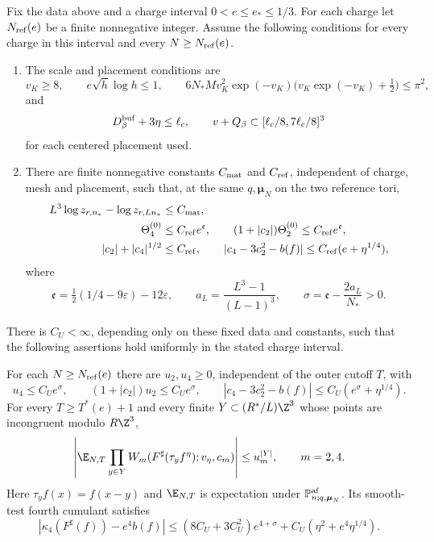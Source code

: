 \begin{theorem}\label{thm:vtm-main}
Fix the data above and a charge interval $0<e\le e_*\le1/3$.
For each charge let $N_{\rm ref}(e)$ be a finite nonnegative integer.
Assume the following conditions for every charge in this interval
and every $N\ge N_{\rm ref}(e)$.
\begin{enumerate}[label=\textup{(\roman*)}]
\item The scale and placement conditions are
\[
 v_K\ge8,\qquad e\sqrt h\log h\le1,\qquad
 6N_*Mv_K^2\exp(-v_K)
          \bigl(v_K\exp(-v_K)+\tfrac12\bigr)\le\pi^2,
\]
and
\begin{equation}\label{eq:cells-fit}
 D_\beta^{\rm buf}+3\eta\le\ell_c,\qquad
 v+Q_\beta\subset[\ell_c/8,7\ell_c/8]^3
\end{equation}
for each centered placement used.
\item There are finite nonnegative constants $C_{\rm mat}$ and
$C_{\rm ref}$, independent of charge, mesh and placement, such that,
at the same $q,\boldsymbol\mu_N$ on the two reference tori,
\begin{align}
 L^3\log z_{r,n_*}-\log z_{r,Ln_*}&\le C_{\rm mat},\notag\\
 \Theta_4^{(0)}&\le C_{\rm ref}e^{\mathfrak e},\qquad
 (1+|c_2|)\Theta_2^{(0)}\le C_{\rm ref}e^{\mathfrak e},
 \label{eq:vtm-reference-hypotheses}\\
 |c_2|+|c_4|^{1/2}&\le C_{\rm ref},\qquad
 |c_4-3c_2^2-b(f)|\le C_{\rm ref}(e+\eta^{1/4}),\notag
\end{align}
where
\[
 \mathfrak e=\tfrac12(1/4-9\varepsilon)-12\varepsilon,\qquad
 a_L=\frac{L^3-1}{(L-1)^3},\qquad
 \sigma=\mathfrak e-\frac{2a_L}{N_*}>0.
\]
\end{enumerate}
There is $C_U<\infty$, depending only on these fixed data and
constants, such that the following assertions hold uniformly
in the stated charge interval.

For each $N\ge N_{\rm ref}(e)$ there are $u_2,u_4\ge0$,
independent of the outer cutoff $T$, with
\begin{equation}\label{eq:vtm-main-errors}
 u_4\le C_Ue^\sigma,\qquad
 (1+|c_2|)u_2\le C_Ue^\sigma,\qquad
 |c_4-3c_2^2-b(f)|\le C_U(e^\sigma+\eta^{1/4}).
\end{equation}
For every $T\ge T^*(e)+1$ and every finite
$Y\subset(R^*/L)\Z^3$ whose points are incongruent modulo $R\Z^3$,
\begin{equation}\label{eq:vtm-main-products}
 \left|\E_{N,T}\prod_{y\in Y}
 W_m(F^\sharp(\tau_yf^\eta);v_\eta,c_m)\right|
              \le u_m^{|Y|},\qquad m=2,4.
\end{equation}
Here $\tau_yf(x)=f(x-y)$ and $\E_{N,T}$ is expectation under
$\mathbb P_{n;q,\boldsymbol\mu_N}^{\rm af}$. Its smooth-test
fourth cumulant satisfies
\begin{equation}\label{eq:vtm-main-finite-cumulant}
 |\kappa_4(F^\sharp(f))-e^4b(f)|
 \le(8C_U+3C_U^2)e^{4+\sigma}
                  +C_U(\eta^2+e^4\eta^{1/4}).
\end{equation}


\end{theorem}
